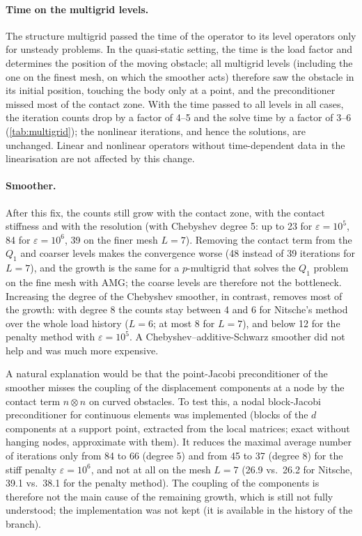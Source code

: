 \documentclass[11pt,a4paper]{article}
\begin{document}
\paragraph{Time on the multigrid levels.}
The structure multigrid passed the time of the operator to its level operators only for unsteady
problems. In the quasi-static setting, the time is the load factor and determines the position of
the moving obstacle; all multigrid levels (including the one on the finest mesh, on which the
smoother acts) therefore saw the obstacle in its initial position, touching the body only at a
point, and the preconditioner missed most of the contact zone. With the time passed to all levels in
all cases, the iteration counts drop by a factor of 4--5 and the solve time by a factor of 3--6
(\cref{tab:multigrid}); the nonlinear iterations, and hence the solutions, are unchanged. Linear and
nonlinear operators without time-dependent data in the linearisation are not affected by this
change.

\paragraph{Smoother.}
After this fix, the counts still grow with the contact zone, with the contact stiffness and with
the resolution (with Chebyshev degree 5: up to 23 for $\varepsilon=10^5$, 84 for $\varepsilon=10^6$,
39 on the finer mesh $L=7$). Removing the contact term from the $Q_1$ and coarser levels makes the
convergence worse (48 instead of 39 iterations for $L=7$), and the growth is the same for a
$p$-multigrid that solves the $Q_1$ problem on the fine mesh with AMG; the coarse levels are
therefore not the bottleneck. Increasing the degree of the Chebyshev smoother, in contrast, removes
most of the growth: with degree 8 the counts stay between 4 and 6 for Nitsche's method over the whole
load history ($L=6$; at most 8 for $L=7$), and below 12 for the penalty method with $\varepsilon=10^5$. A Chebyshev--additive-Schwarz smoother did not
help and was much more expensive.

A natural explanation would be that the point-Jacobi preconditioner of the smoother misses the
coupling of the displacement components at a node by the contact term $n\otimes n$ on curved
obstacles. To test this, a nodal block-Jacobi preconditioner for continuous elements was
implemented (blocks of the $d$ components at a support point, extracted from the local matrices;
exact without hanging nodes, approximate with them). It reduces the maximal average number of
iterations only from 84 to 66 (degree 5) and from 45 to 37 (degree 8) for the stiff penalty
$\varepsilon=10^6$, and not at all on the mesh $L=7$ (26.9 vs.\ 26.2 for Nitsche, 39.1 vs.\ 38.1
for the penalty method). The coupling of the components is therefore not the main cause of the
remaining growth, which is still not fully understood; the implementation was not kept (it is
available in the history of the branch).
\end{document}
